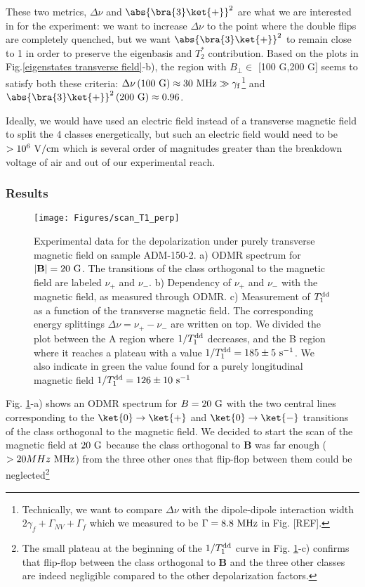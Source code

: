 \documentclass[a4paper,11pt]{report}
\begin{document}
These two metrics, $\Delta \nu$ and $\abs{\bra{3}\ket{+}}^2$ are what we are interested in for the experiment: we want to increase $\Delta \nu$ to the point where the double flips are completely quenched, but we want $\abs{\bra{3}\ket{+}}^2$ to remain close to 1 in order to preserve the eigenbasis and $T_2^*$ contribution. Based on the plots in Fig.\ref{eigenstates transverse field}-b), the region with $B_\perp \in$ [100 G,200 G] seems to satisfy both these criteria: $\Delta \nu\,(100\ \rm G) \approx 30\ \rm MHz \gg \gamma_f$\footnote{Technically, we want to compare $\Delta \nu$ with the dipole-dipole interaction width $2\gamma_f+\Gamma_{NV}+\Gamma_f$ which we measured to be $\Gamma=8.8\ \rm MHz$ in Fig. [REF].} and $\abs{\bra{3}\ket{+}}^2\, (200\ \rm G) \approx 0.96$.

Ideally, we would have used an electric field instead of a transverse magnetic field to split the 4 classes energetically, but such an electric field would need to be $> 10^6\ \rm{V/cm}$ which is several order of magnitudes greater than the breakdown voltage of air and out of our experimental reach.

\subsubsection{Results}

\begin{figure}[h!]
\centering
\texttt{[image: Figures/scan\_T1\_perp]}
\caption{Experimental data for the depolarization under purely transverse magnetic field on sample ADM-150-2. a) ODMR spectrum for $|\mathbf{B}|=20\ \rm G$. The transitions of the class orthogonal to the magnetic field are labeled $\nu_+$ and $\nu_-$. b) Dependency of $\nu_+$ and $\nu_-$ with the magnetic field, as measured through ODMR. c) Measurement of $T_1^{\rm dd}$ as a function of the transverse magnetic field. The corresponding energy splittings $\Delta \nu=\nu_+-\nu_-$ are written on top. We divided the plot between the A region where $1/T_1^{\rm dd}$ decreases, and the B region where it reaches a plateau with a value $1/T_1^{\rm dd}=185 \pm 5\ \rm s^{-1}$. We also indicate in green the value found for a purely longitudinal magnetic field $1/T_1^{\rm dd}=126 \pm 10\ \rm s^{-1}$}
\label{champ tranverse exp}
\end{figure}

Fig. \ref{champ tranverse exp}-a) shows an ODMR spectrum for $B=20\ \rm G$ with the two central lines corresponding to the $\ket{0} \to \ket{+}$ and $\ket{0} \to \ket{-}$ transitions of the class orthogonal to the magnetic field. We decided to start the scan of the magnetic field at $20\ \rm G$ because the class orthogonal to $\mathbf{B}$ was far enough ($> 20 MHz\ \rm MHz$) from the three other ones that flip-flop between them could be neglected\footnote{The small plateau at the beginning of the $1/T_1^{\rm dd}$ curve in Fig. \ref{champ tranverse exp}-c) confirms that flip-flop between the class orthogonal to $\mathbf{B}$ and the three other classes are indeed negligible compared to the other depolarization factors.}
\end{document}
